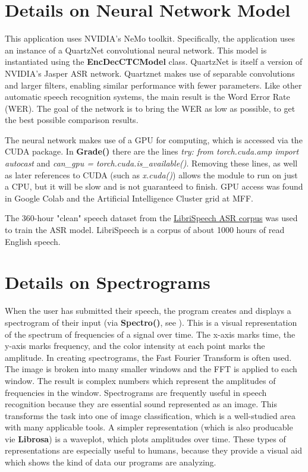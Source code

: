 \documentclass[12pt, letterpaper]{article}
\begin{document}
\newpage%


\section*{Details on Neural Network Model} \label{NNs}
This application uses NVIDIA's NeMo toolkit. Specifically, the application uses an instance of a QuartzNet convolutional neural network. This model is instantiated using the \textbf{EncDecCTCModel} class. QuartzNet is itself a version of NVIDIA's Jasper ASR network. Quartznet makes use of separable convolutions and larger filters, enabling similar performance with fewer parameters. Like other automatic speech recognition systems, the main result is the Word Error Rate (WER). The goal of the network is to bring the WER as low as possible, to get the best possible comparison results. 

The neural network makes use of a GPU for computing, which is accessed via the CUDA package. In \textbf{Grade()} there are the lines \textit{try: from torch.cuda.amp import autocast} and \textit{can\_gpu = torch.cuda.is\_available()}. Removing these lines, as well as later references to CUDA (such as \textit{x.cuda()}) allows the module to run on just a CPU, but it will be slow and is not guaranteed to finish. GPU access was found in Google Colab and the Artificial Intelligence Cluster grid at MFF.

The 360-hour "clean" speech dataset from the \href{http://www.openslr.org/12/}{LibriSpeech ASR corpus} was used to train the ASR model. LibriSpeech is a corpus of about 1000 hours of read English speech.


\section*{Details on Spectrograms} \label{spectrograms}
When the user has submitted their speech, the program creates and displays a spectrogram of their input (via \textbf{Spectro()}, see ). This is a visual representation of the spectrum of frequencies of a signal over time. The x-axis marks time, the y-axis marks frequency, and the color intensity at each point marks the amplitude. In creating spectrograms, the Fast Fourier Transform is often used. The image is broken into many smaller windows and the FFT is applied to each window. The result is complex numbers which represent the amplitudes of frequencies in the window. Spectrograms are frequently useful in speech recognition because they are essential sound represented as an image. This transforms the task into one of image classification, which is a well-studied area with many applicable tools. A simpler representation (which is also producable vie \textbf{Librosa}) is a waveplot, which plots amplitudes over time. These types of representations are especially useful to humans, because they provide a visual aid which shows the kind of data our programs are analyzing.
\end{document}
